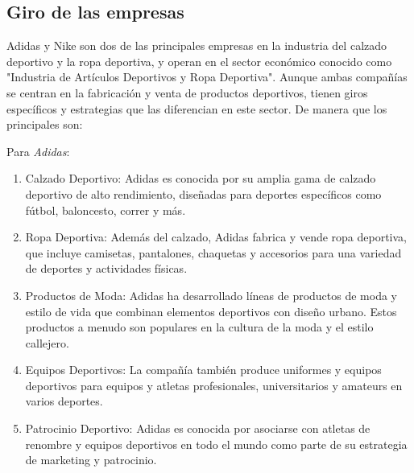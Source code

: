 \documentclass[a4paper,12pt]{article}
\begin{document}
\subsection{Giro de las empresas}

Adidas y Nike son dos de las principales empresas en la industria del calzado deportivo y la ropa deportiva, y operan en el sector económico conocido como "Industria de Artículos Deportivos y Ropa Deportiva". Aunque ambas compañías se centran en la fabricación y venta de productos deportivos, tienen giros específicos y estrategias que las diferencian en este sector. De manera que los principales son:

Para \emph{Adidas}:
\begin{enumerate}
	\item Calzado Deportivo: Adidas es conocida por su amplia gama de calzado deportivo de alto rendimiento, diseñadas para deportes específicos como fútbol, baloncesto, correr y más.

	\item Ropa Deportiva: Además del calzado, Adidas fabrica y vende ropa deportiva, que incluye camisetas, pantalones, chaquetas y accesorios para una variedad de deportes y actividades físicas.

	\item Productos de Moda: Adidas ha desarrollado líneas de productos de moda y estilo de vida que combinan elementos deportivos con diseño urbano. Estos productos a menudo son populares en la cultura de la moda y el estilo callejero.

	\item Equipos Deportivos: La compañía también produce uniformes y equipos deportivos para equipos y atletas profesionales, universitarios y amateurs en varios deportes.

	\item Patrocinio Deportivo: Adidas es conocida por asociarse con atletas de renombre y equipos deportivos en todo el mundo como parte de su estrategia de marketing y patrocinio.
\end{enumerate}
\end{document}
